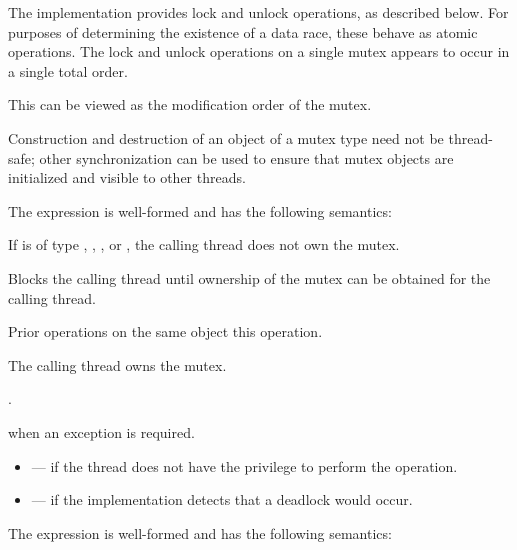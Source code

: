 \pnum
The implementation provides lock and unlock operations, as described below.
For purposes of determining the existence of a data race, these behave as
atomic operations. The lock and unlock operations on
a single mutex appears to occur in a single total order.
\begin{note}
This
can be viewed as the modification order of the
mutex.
\end{note}
\begin{note}
Construction and
destruction of an object of a mutex type need not be thread-safe; other
synchronization can be used to ensure that mutex objects are initialized
and visible to other threads.
\end{note}

\pnum
The expression  is well-formed and has the following semantics:

\begin{itemdescr}
\pnum
\expects
If  is of type , ,
, or , the calling
thread does not own the mutex.

\pnum
{}%
\effects
Blocks the calling thread until ownership of the mutex can be obtained for the calling thread.

\pnum
\sync
Prior  operations on the same object
 this operation.

\pnum
\ensures
The calling thread owns the mutex.

\pnum
\returntype {}.

\pnum
\throws
{} when
an exception is required.

\pnum
\errors
\begin{itemize}
\item {} --- if the thread does not have the
privilege to perform the operation.

\item {} --- if the implementation detects
that a deadlock would occur.
\end{itemize}
\end{itemdescr}

\pnum
The expression  is well-formed and has the following semantics:

